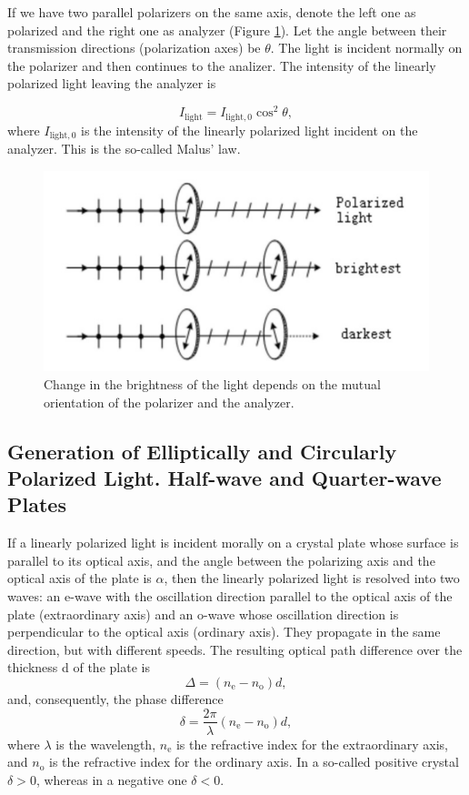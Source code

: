 \documentclass{article}
\begin{document}
If we have two parallel polarizers on the same axis, denote the left one as polarized and the right one as analyzer (Figure \ref{fig.Malus}). Let the angle between their transmission directions (polarization axes) be $\theta$. The light is incident normally on the polarizer and then continues to the analizer. The intensity of the linearly polarized light leaving the analyzer is

\begin{equation}\label{eq.Malus}
I_{\text{light}} = I_{\text{light},0}\cos^2\theta,
\end{equation}
where $I_{\text{light},0}$ is the intensity of the linearly polarized light incident on the analyzer. This is the so-called Malus' law.

\begin{figure}[H]
\centering
\includegraphics[scale=1.0]{polar.png}
\caption{Change in the brightness of the light depends on the mutual orientation of the polarizer and the analyzer.}\label{fig.Malus}
\end{figure}

\subsection{Generation of Elliptically and Circularly Polarized Light. Half-wave and Quarter-wave Plates}

If a linearly polarized light is incident morally on a crystal plate whose surface is parallel to its optical axis, and the angle between the polarizing axis and the optical axis of the plate is $\alpha$, then the linearly polarized light is resolved into two waves: an e-wave with the oscillation direction parallel to the optical axis of the plate (extraordinary axis) and an o-wave whose oscillation direction is perpendicular to the optical axis (ordinary axis). They propagate in the same direction, but with different speeds. The resulting optical path difference over the thickness d of the plate is
$$\Delta = (n_\text{e} - n_\text{o})d,$$
and, consequently, the phase difference
$$\delta = \frac{2\pi}{\lambda}(n_\text{e} - n_\text{o})d,$$ 
where $\lambda$ is the wavelength, $n_\text{e}$ is the refractive index for the extraordinary axis, and $n_\text{o}$ is the refractive index for the ordinary axis. In a so-called positive crystal $\delta > 0$, whereas in a negative one $\delta < 0$.
\end{document}
